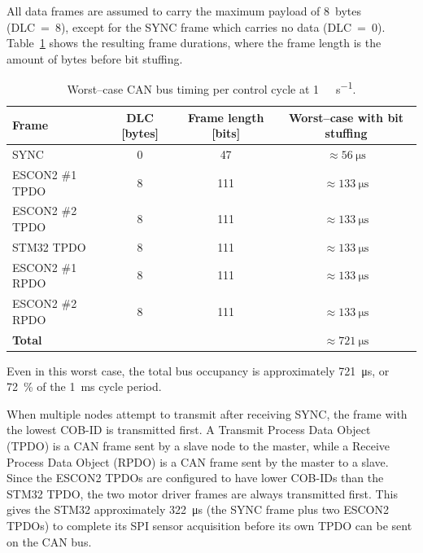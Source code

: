 \documentclass[11pt,a4paper,twoside,openright]{book}
\begin{document}
All data frames are assumed to carry the maximum payload of 8~bytes (DLC~=~8), except for the SYNC frame which carries no data (DLC~=~0). Table~\ref{tab:bus-timing} shows the resulting frame durations, where the frame length is the amount of bytes before bit stuffing.

\begin{table}[htbp]
    \centering
    \begin{tabular}{l c c c}
        \toprule
        Frame & DLC [bytes] & Frame length [bits] & Worst--case with bit stuffing\\
        \midrule
        SYNC                & 0 & 47  & $\approx \SI{56}{\micro\second}$ \\
        ESCON2 \#1 TPDO     & 8 & 111 & $\approx \SI{133}{\micro\second}$ \\
        ESCON2 \#2 TPDO     & 8 & 111 & $\approx \SI{133}{\micro\second}$ \\
        STM32 TPDO          & 8 & 111 & $\approx \SI{133}{\micro\second}$ \\
        ESCON2 \#1 RPDO     & 8 & 111 & $\approx \SI{133}{\micro\second}$ \\
        ESCON2 \#2 RPDO     & 8 & 111 & $\approx \SI{133}{\micro\second}$ \\
        \midrule
        \textbf{Total}      &   &     & $\approx \SI{721}{\micro\second}$ \\
        \bottomrule
    \end{tabular}
    \caption{Worst--case CAN bus timing per control cycle at 
    \SI{1}{\mega\bit\per\second}.}
    \label{tab:bus-timing}
\end{table}

Even in this worst case, the total bus occupancy is approximately \SI{721}{\micro\second}, or \SI{72}{\percent} of the \SI{1}{\milli\second} cycle period. 

When multiple nodes attempt to transmit after receiving SYNC, the frame with the lowest COB-ID is transmitted first. A Transmit Process Data Object (TPDO) is a CAN frame sent by a slave node to the master, while a Receive Process Data Object (RPDO) is a CAN frame sent by the master to a slave. Since the ESCON2 TPDOs are configured to have lower COB-IDs than the STM32 TPDO, the two motor driver frames are always transmitted first. This gives the STM32 approximately \SI{322}{\micro\second} (the SYNC frame plus two ESCON2 TPDOs) to complete its SPI sensor acquisition before its own TPDO can be sent on the CAN bus.
\end{document}
